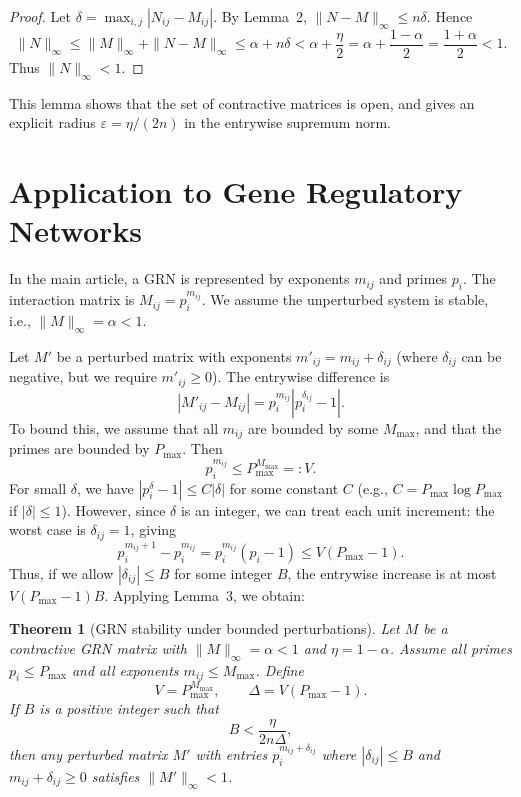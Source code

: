 \documentclass[12pt,a4paper]{article}
\newtheorem{theorem}{Theorem}
\begin{document}
\begin{proof}
Let $\delta = \max_{i,j} |N_{ij} - M_{ij}|$. By Lemma~2, $\|N - M\|_\infty \le n \delta$. Hence
\[
\|N\|_\infty \le \|M\|_\infty + \|N-M\|_\infty \le \alpha + n \delta < \alpha + \frac{\eta}{2} = \alpha + \frac{1-\alpha}{2} = \frac{1+\alpha}{2} < 1.
\]
Thus $\|N\|_\infty < 1$.
\end{proof}

This lemma shows that the set of contractive matrices is open, and gives an explicit radius $\varepsilon = \eta/(2n)$ in the entrywise supremum norm.

\section{Application to Gene Regulatory Networks}

In the main article, a GRN is represented by exponents $m_{ij}$ and primes $p_i$. The interaction matrix is $M_{ij} = p_i^{m_{ij}}$. We assume the unperturbed system is stable, i.e., $\|M\|_\infty = \alpha < 1$.

Let $M'$ be a perturbed matrix with exponents $m'_{ij} = m_{ij} + \delta_{ij}$ (where $\delta_{ij}$ can be negative, but we require $m'_{ij} \ge 0$). The entrywise difference is
\[
|M'_{ij} - M_{ij}| = p_i^{m_{ij}} \left| p_i^{\delta_{ij}} - 1 \right|.
\]
To bound this, we assume that all $m_{ij}$ are bounded by some $M_{\max}$, and that the primes are bounded by $P_{\max}$. Then
\[
p_i^{m_{ij}} \le P_{\max}^{M_{\max}} =: V.
\]
For small $\delta$, we have $|p_i^{\delta} - 1| \le C |\delta|$ for some constant $C$ (e.g., $C = P_{\max} \log P_{\max}$ if $|\delta| \le 1$). However, since $\delta$ is an integer, we can treat each unit increment: the worst case is $\delta_{ij} = 1$, giving
\[
p_i^{m_{ij}+1} - p_i^{m_{ij}} = p_i^{m_{ij}}(p_i-1) \le V (P_{\max}-1).
\]
Thus, if we allow $|\delta_{ij}| \le B$ for some integer $B$, the entrywise increase is at most $V (P_{\max}-1) B$. Applying Lemma~3, we obtain:

\begin{theorem}[GRN stability under bounded perturbations]
Let $M$ be a contractive GRN matrix with $\|M\|_\infty = \alpha < 1$ and $\eta = 1 - \alpha$. Assume all primes $p_i \le P_{\max}$ and all exponents $m_{ij} \le M_{\max}$. Define
\[
V = P_{\max}^{M_{\max}}, \qquad \Delta = V (P_{\max}-1).
\]
If $B$ is a positive integer such that
\[
B < \frac{\eta}{2n \Delta},
\]
then any perturbed matrix $M'$ with entries $p_i^{m_{ij} + \delta_{ij}}$ where $|\delta_{ij}| \le B$ and $m_{ij}+\delta_{ij} \ge 0$ satisfies $\|M'\|_\infty < 1$.
\end{theorem}
\end{document}
